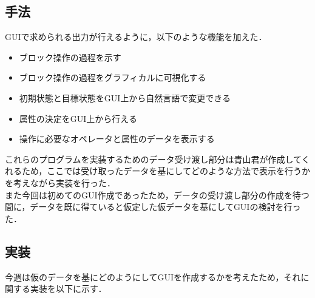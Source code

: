 \documentclass[12pt]{jarticle}
\begin{document}
\subsection{手法}
GUIで求められる出力が行えるように，以下のような機能を加えた．

\begin{itemize}
\item ブロック操作の過程を示す
\item ブロック操作の過程をグラフィカルに可視化する
\item 初期状態と目標状態をGUI上から自然言語で変更できる
\item 属性の決定をGUI上から行える
\item 操作に必要なオペレータと属性のデータを表示する
\end{itemize}

これらのプログラムを実装するためのデータ受け渡し部分は青山君が作成してくれるため，ここでは受け取ったデータを基にしてどのような方法で表示を行うかを考えながら実装を行った．\\

また今回は初めてのGUI作成であったため，データの受け渡し部分の作成を待つ間に，データを既に得ていると仮定した仮データを基にしてGUIの検討を行った．\\

\subsection{実装}
今週は仮のデータを基にどのようにしてGUIを作成するかを考えたため，それに関する実装を以下に示す．
\end{document}
